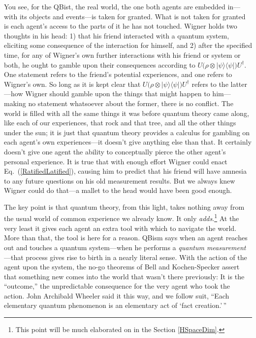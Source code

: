 You see, for the QBist, the real world, the one both agents are embedded in---with its objects and events---is taken for granted.  What is not taken for granted is each agent's access to the parts of it he has not touched.  Wigner holds two thoughts in his head: 1) that his friend interacted with a quantum system, eliciting some consequence of the interaction for himself, and 2) after the specified time, for any of Wigner's own further interactions with his friend or system or both, he ought to gamble upon their consequences according to $U\big(\rho\otimes|\psi\rangle\langle\psi|\big)U^\dagger$.  One statement refers to the friend's potential experiences, and one refers to Wigner's own.  So long as it is kept clear that $U\big(\rho\otimes|\psi\rangle\langle\psi|\big)U^\dagger$ refers to the latter---how Wigner should gamble upon the things that might happen to him---making no statement whatsoever about the former, there is no conflict.  The world is filled with all the same things it was before quantum theory came along, like each of our experiences, that rock and that tree, and all the other things under the sun; it is just that quantum theory provides a calculus for gambling on each agent's own experiences---it doesn't give anything else than that.  It certainly doesn't give one agent the ability to conceptually pierce the other agent's personal experience.  It is true that with enough effort Wigner could enact Eq.~(\ref{RatifiedLatified}), causing him to predict that his friend will have amnesia to any future questions on his old measurement results.  But we always knew Wigner could do that---a mallet to the head would have been good enough.

The key point is that quantum theory, from this light, takes nothing away from the usual world of common experience we already know.  It only {\it adds}.\footnote{This point will be much elaborated on in the Section \ref{HSpaceDim}.}  At the very least it gives each agent an extra tool with which to navigate the world.  More than that, the tool is here for a reason.  QBism says when an agent reaches out and touches a quantum system---when he performs a {\it quantum measurement}---that process gives rise to birth in a nearly literal sense.  With the action of the agent upon the system, the no-go theorems of Bell and Kochen-Specker assert that something new comes into the world that wasn't there previously:  It is the ``outcome,'' the unpredictable consequence for the very agent who took the action.  John Archibald Wheeler said it this way, and we follow suit, ``Each elementary quantum phenomenon is an elementary act of `fact creation.'\,''  \cite{Wheeler82c}

